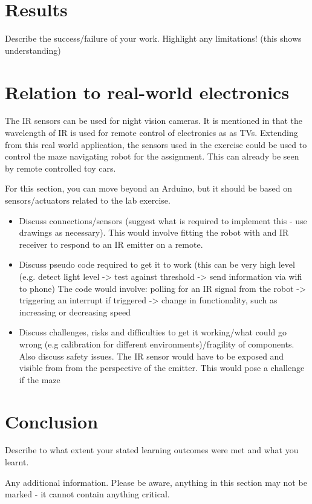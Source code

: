 \documentclass[journal]{IEEEtran}
\begin{document}
\section{Results}
Describe the success/failure of your work.
Highlight any limitations! (this shows understanding)

\section{Relation to real-world electronics}

The IR sensors can be used for night vision cameras. It is mentioned in \cite{elec1601_notes} that the wavelength of IR is used for remote control of electronics as as TVs. Extending from this real world application, the sensors used in the exercise could be used to control the maze navigating robot for the assignment. This can already be seen by remote controlled toy cars.

For this section, you can move beyond an Arduino, but it should be based on  sensors/actuators related to the lab exercise.


\begin{itemize}
  \item {Discuss connections/sensors (suggest what is required to implement this - use drawings as necessary). This would involve fitting the robot with and IR receiver to respond to an IR emitter on a remote.}
  \item {Discuss pseudo code required to get it to work (this can be very high level (e.g. detect light level -> test against threshold -> send information via wifi to phone) 
  The code would involve: polling for an IR signal from the robot -> triggering an interrupt if triggered -> change in functionality, such as increasing or decreasing speed}
  \item {Discuss challenges, risks and difficulties to get it working/what could go wrong (e.g calibration for different environments)/fragility of components. Also discuss safety issues.
  The IR sensor would have to be exposed and visible from from the perspective of the emitter. This would pose a challenge if the maze}
\end{itemize}

\section{Conclusion}
Describe to what extent your stated learning outcomes were met and what you learnt.




\appendix

Any additional information. Please be aware, anything in this section may not be marked - it cannot contain anything critical. 
\end{document}
